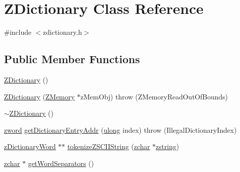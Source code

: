 \hypertarget{class_z_dictionary}{\section{Z\-Dictionary Class Reference}
\label{class_z_dictionary}
}


{\ttfamily \#include $<$zdictionary.\-h$>$}

\subsection*{Public Member Functions}
\begin{DoxyCompactItemize}
\item 
\hyperlink{class_z_dictionary_a83a17daa48fba56e2ab0bf854f5a9318}{Z\-Dictionary} ()
\item 
\hyperlink{class_z_dictionary_aeca7959ca07a10b82e0179d4d17b9a22}{Z\-Dictionary} (\hyperlink{class_z_memory}{Z\-Memory} $\ast$z\-Mem\-Obj)  throw (\-Z\-Memory\-Read\-Out\-Of\-Bounds)
\item 
\hyperlink{class_z_dictionary_a302e3b83418ad1367f7bae991a270011}{$\sim$\-Z\-Dictionary} ()
\item 
\hyperlink{zglobal_8h_a6507dc55d18847442d5fb20b6c73fe73}{zword} \hyperlink{class_z_dictionary_a89cf4a5cbc0b770d8ac1aed19432d251}{get\-Dictionary\-Entry\-Addr} (\hyperlink{zglobal_8h_a718b4eb2652c286f4d42dc18a8e71a1a}{ulong} index)  throw (\-Illegal\-Dictionary\-Index)
\item 
\hyperlink{structz_dictionary_word}{z\-Dictionary\-Word} $\ast$$\ast$ \hyperlink{class_z_dictionary_a7ebd06ccc61abad818515d11cb0c39d3}{tokenize\-Z\-S\-C\-I\-I\-String} (\hyperlink{zglobal_8h_aef68b14f6fcd84f18d5b177486e4999b}{zchar} $\ast$\hyperlink{ztext_2ztext_2main_8cpp_ae991afe9cf5a78d591f33cce735aa9c7}{zstring})
\item 
\hyperlink{zglobal_8h_aef68b14f6fcd84f18d5b177486e4999b}{zchar} $\ast$ \hyperlink{class_z_dictionary_a1abd5cfd2321793d00ef62876bc3f3a9}{get\-Word\-Separators} ()
\end{DoxyCompactItemize}


